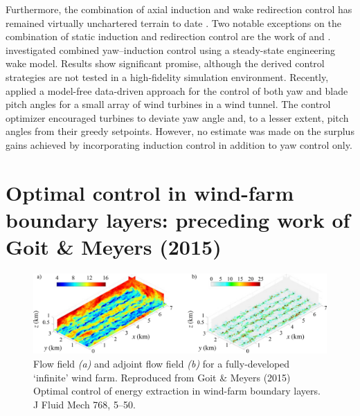 Furthermore, the combination of axial induction and wake redirection control has remained virtually unchartered terrain to date \citep{boersma2017tutorial}. Two notable exceptions on the combination of static induction and redirection control are the work of \cite{park2015cooperative} and \cite{park2017data}. \cite{park2015cooperative} investigated combined yaw--induction control using a steady-state engineering wake model. Results show significant promise, although the derived control strategies are not tested in a high-fidelity simulation environment. Recently, \cite{park2017data} applied a model-free data-driven approach for the control of both yaw and blade pitch angles for a small array of wind turbines in a wind tunnel. The control optimizer encouraged turbines to deviate yaw angle and, to a lesser extent, pitch angles from their greedy setpoints. However, no estimate was made on the surplus gains achieved by incorporating induction control in addition to yaw control only. 

\section{Optimal control in wind-farm boundary layers: preceding work of Goit \& Meyers (2015)}\label{sec:goitmeyersjfm}

\begin{figure}
	\includegraphics[width=\textwidth]{chapters/introduction/forward_adjoint4.eps}
	\caption{Flow field \emph{(a)} and adjoint flow field \emph{(b)} for a fully-developed `infinite' wind farm. Reproduced from Goit \& Meyers (2015) Optimal control of energy extraction in wind-farm boundary layers. J Fluid Mech 768, 5--50. \label{fig:flowfield_intro}}
\end{figure}

